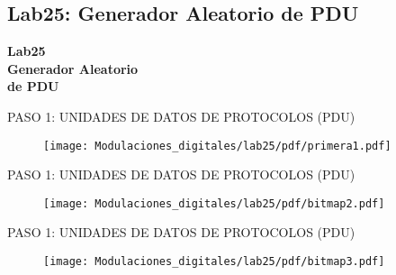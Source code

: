 \subsection{Lab25: Generador Aleatorio de PDU}
\begin{frame}{}


\bfseries{\textrm{\LARGE Lab25\\ \Large Generador Aleatorio \\de PDU}}
\raggedright
\end{frame}


\begin{frame}{PASO 1: UNIDADES DE DATOS DE PROTOCOLOS (PDU)}

\begin{figure}[H]
\centering
\vspace{-3mm}
\texttt{[image: Modulaciones\_digitales/lab25/pdf/primera1.pdf]}
\end{figure}

\end{frame}

\begin{frame}{PASO 1: UNIDADES DE DATOS DE PROTOCOLOS (PDU)}

\begin{figure}[H]
\centering
\vspace{-3mm}
\texttt{[image: Modulaciones\_digitales/lab25/pdf/bitmap2.pdf]}
\end{figure}

\end{frame}

\begin{frame}{PASO 1: UNIDADES DE DATOS DE PROTOCOLOS (PDU)}

\begin{figure}[H]
\centering
\vspace{-3mm}
\texttt{[image: Modulaciones\_digitales/lab25/pdf/bitmap3.pdf]}
\end{figure}

\end{frame}

